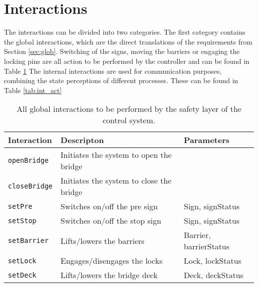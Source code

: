 \section{Interactions}
\label{sec:act}

The interactions can be divided into two categories. The first category contains the global interactions, which are the direct translations of the requirements from Section \ref{sec:glob}.
Switching of the signs, moving the barriers or engaging the locking pins are all action to be performed by the controller and can be found in Table \ref{tab:glob_act}
The internal interactions are used for communication purposes, combining the state perceptions of different processes. These can be found in Table \ref{tab:int_act}
%
\begin{table}[htb]%
\begin{tabular}{lll}
      \textbf{Interaction} &	\textbf{Descripton}	&	\textbf{Parameters}\\
      \hline
      \texttt{openBridge} & Initiates the system to open the bridge &\\
      \texttt{closeBridge} & Initiates the system to close the bridge & \\
      \texttt{setPre} & Switches on/off the pre sign & Sign, signStatus\\
      \texttt{setStop} & Switches on/off the stop sign & Sign, signStatus\\
      \texttt{setBarrier} & Lifts/lowers the barriers & Barrier, barrierStatus\\
      \texttt{setLock} & Engages/disengages the locks & Lock, lockStatus\\
      \texttt{setDeck} & Lifts/lowers the bridge deck & Deck, deckStatus\\
\end{tabular}
\caption{All global interactions to be performed by the safety layer of the control system.}
\label{tab:glob_act}
\end{table}

